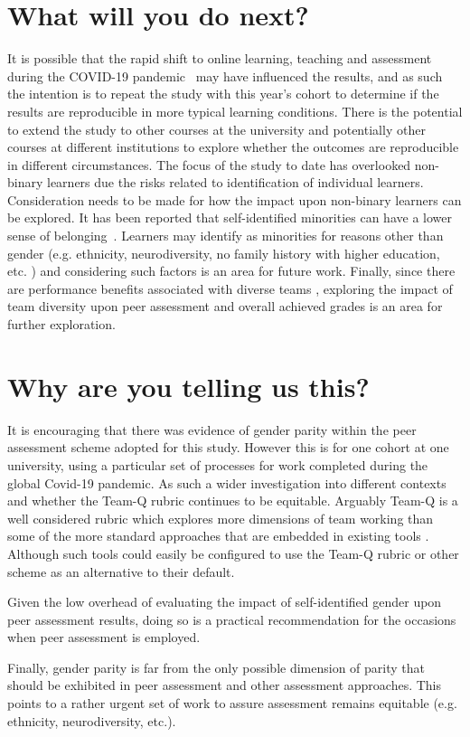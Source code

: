 \documentclass[sigconf, anonymous=true]{acmart}
\begin{document}
\section{What will you do next?}
It is possible that the rapid shift to online learning, teaching and
assessment during the COVID-19 pandemic~\cite{crick-et-al:ukicer2020}
may have influenced the results, and as such the intention is to
repeat the study with this year's cohort to determine if the results
are reproducible in more typical learning conditions. There is the
potential to extend the study to other courses at the university and
potentially other courses at different institutions to explore whether
the outcomes are reproducible in different circumstances. The focus of
the study to date has overlooked non-binary learners due the risks
related to identification of individual learners. Consideration needs
to be made for how the impact upon non-binary learners can be
explored. It has been reported that self-identified minorities can
have a lower sense of belonging~\cite{Mooney2020}. Learners may
identify as minorities for reasons other than gender (e.g. ethnicity,
neurodiversity, no family history with higher education, etc. ) and
considering such factors is an area for future work. Finally, since
there are performance benefits associated with diverse teams
\cite{HBR206}, exploring the impact of team diversity upon peer
assessment and overall achieved grades is an area for further
exploration.


\section{Why are you telling us this?}
It is encouraging that there was evidence of gender parity within the peer assessment scheme adopted for this study. However this is for one cohort at one university, using a particular set of processes for work completed during the global Covid-19 pandemic. As such a wider investigation into different contexts and whether the Team-Q rubric continues to be equitable. Arguably Team-Q is a well considered rubric which explores more dimensions of team working than some of the more standard approaches that are embedded in existing tools \cite{WebPA,BuddyCheck,SparkPlus}. Although such tools could easily be configured to use the Team-Q rubric or other scheme as an alternative to their default.

Given the low overhead of evaluating the impact of self-identified gender upon peer assessment results, doing so is a practical recommendation for the occasions when peer assessment is employed.

Finally, gender parity is far from the only possible dimension of parity that should be exhibited in peer assessment and other assessment approaches. This points to a rather urgent set of work to assure assessment remains equitable (e.g. ethnicity, neurodiversity, etc.). 


\end{document}
